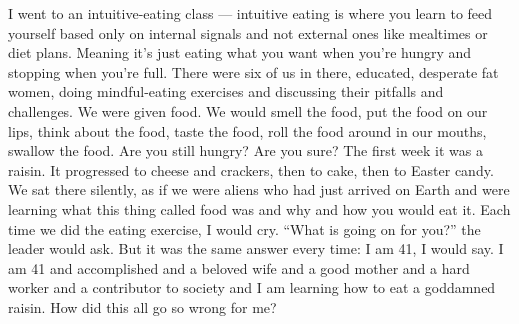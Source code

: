 I went to an intuitive-eating class --- intuitive eating is where you
learn to feed yourself based only on internal signals and not external
ones like mealtimes or diet plans. Meaning it's just eating what you
want when you're hungry and stopping when you're full. There were six of
us in there, educated, desperate fat women, doing mindful-eating
exercises and discussing their pitfalls and challenges. We were given
food. We would smell the food, put the food on our lips, think about the
food, taste the food, roll the food around in our mouths, swallow the
food. Are you still hungry? Are you sure? The first week it was a
raisin. It progressed to cheese and crackers, then to cake, then to
Easter candy. We sat there silently, as if we were aliens who had just
arrived on Earth and were learning what this thing called food was and
why and how you would eat it. Each time we did the eating exercise, I
would cry. ``What is going on for you?'' the leader would ask. But it
was the same answer every time: I am 41, I would say. I am 41 and
accomplished and a beloved wife and a good mother and a hard worker and
a contributor to society and I am learning how to eat a goddamned
raisin. How did this all go so wrong for me?

